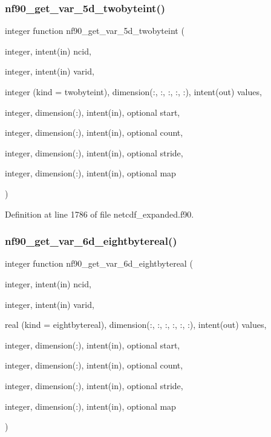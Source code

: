 \subsubsection{\texorpdfstring{nf90\+\_\+get\+\_\+var\+\_\+5d\+\_\+twobyteint()}{nf90\_get\_var\_5d\_twobyteint()}}
{\footnotesize\ttfamily integer function nf90\+\_\+get\+\_\+var\+\_\+5d\+\_\+twobyteint (\begin{DoxyParamCaption}\item[{integer, intent(in)}]{ncid,  }\item[{integer, intent(in)}]{varid,  }\item[{integer (kind = twobyteint), dimension(\+:, \+:, \+:, \+:, \+:), intent(out)}]{values,  }\item[{integer, dimension(\+:), intent(in), optional}]{start,  }\item[{integer, dimension(\+:), intent(in), optional}]{count,  }\item[{integer, dimension(\+:), intent(in), optional}]{stride,  }\item[{integer, dimension(\+:), intent(in), optional}]{map }\end{DoxyParamCaption})}



Definition at line 1786 of file netcdf\+\_\+expanded.\+f90.

\mbox{\label{netcdf__expanded_8f90_a038aa337e9320b6b9f44239a30b70bef}} 
\subsubsection{\texorpdfstring{nf90\+\_\+get\+\_\+var\+\_\+6d\+\_\+eightbytereal()}{nf90\_get\_var\_6d\_eightbytereal()}}
{\footnotesize\ttfamily integer function nf90\+\_\+get\+\_\+var\+\_\+6d\+\_\+eightbytereal (\begin{DoxyParamCaption}\item[{integer, intent(in)}]{ncid,  }\item[{integer, intent(in)}]{varid,  }\item[{real (kind = eightbytereal), dimension(\+:, \+:, \+:, \+:, \+:, \+:), intent(out)}]{values,  }\item[{integer, dimension(\+:), intent(in), optional}]{start,  }\item[{integer, dimension(\+:), intent(in), optional}]{count,  }\item[{integer, dimension(\+:), intent(in), optional}]{stride,  }\item[{integer, dimension(\+:), intent(in), optional}]{map }\end{DoxyParamCaption})}



